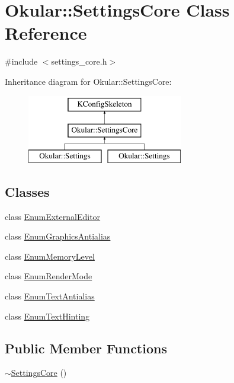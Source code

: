 \hypertarget{classOkular_1_1SettingsCore}{\section{Okular\+:\+:Settings\+Core Class Reference}
\label{classOkular_1_1SettingsCore}
}


{\ttfamily \#include $<$settings\+\_\+core.\+h$>$}

Inheritance diagram for Okular\+:\+:Settings\+Core\+:\begin{figure}[H]
\begin{center}
\leavevmode
\includegraphics[height=3.000000cm]{classOkular_1_1SettingsCore}
\end{center}
\end{figure}
\subsection*{Classes}
\begin{DoxyCompactItemize}
\item 
class \hyperlink{classOkular_1_1SettingsCore_1_1EnumExternalEditor}{Enum\+External\+Editor}
\item 
class \hyperlink{classOkular_1_1SettingsCore_1_1EnumGraphicsAntialias}{Enum\+Graphics\+Antialias}
\item 
class \hyperlink{classOkular_1_1SettingsCore_1_1EnumMemoryLevel}{Enum\+Memory\+Level}
\item 
class \hyperlink{classOkular_1_1SettingsCore_1_1EnumRenderMode}{Enum\+Render\+Mode}
\item 
class \hyperlink{classOkular_1_1SettingsCore_1_1EnumTextAntialias}{Enum\+Text\+Antialias}
\item 
class \hyperlink{classOkular_1_1SettingsCore_1_1EnumTextHinting}{Enum\+Text\+Hinting}
\end{DoxyCompactItemize}
\subsection*{Public Member Functions}
\begin{DoxyCompactItemize}
\item 
\hyperlink{classOkular_1_1SettingsCore_a159c4e920330e09bf5b7be26c50ed69c}{$\sim$\+Settings\+Core} ()
\end{DoxyCompactItemize}
